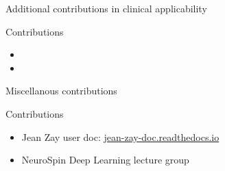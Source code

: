 \documentclass[aspectratio=169,xcolor=dvipsnames]{beamer}
\begin{document}
\begin{frame}{Additional contributions in clinical applicability}
    \begin{exampleblock}{Contributions}
        \begin{itemize}
            \item {}
            \item {}
        \end{itemize}
    \end{exampleblock}
\end{frame}

\begin{frame}{Miscellanous contributions}
    \begin{exampleblock}{Contributions}
        \begin{itemize}
            \item Jean Zay user doc: \href{https://jean-zay-doc.readthedocs.io/}{jean-zay-doc.readthedocs.io}
            \item NeuroSpin Deep Learning lecture group
        \end{itemize}
    \end{exampleblock}
\end{frame}
\end{document}
